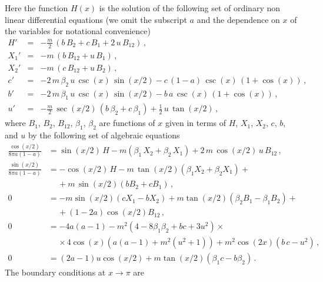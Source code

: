 \documentclass[11pt]{article}
\def\nn{\nonumber}
\begin{document}
Here the function $H(x)$ is the solution of the following set of ordinary non linear differential equations (we omit the subscript $a$ and the dependence on $x$ of the variables for notational convenience)
\begin{eqnarray} 
H' &=& - \frac{m}{2}\,\left( b\,B_2 +c\, B_1 + 2\,u\,B_{12} \right)\label{hprima}\,,\\
X_1' &=& - m\,\left( b\,B_{12}+ u\,B_1 \right)\label{x1prima} \,,\\
X_2' &=& - m\,\left( c\,B_{12} + u\,B_2 \right) \label{x2prima}\,,\\
c' &=&- 2\,m\,\beta_2 \,u\, \csc(x)\,\sin(x/2) - c\,(1 - a)\,\csc(x)\,(1 + \cos(x))\label{cprima}\,, \\
b' &=& -2\,m\,\beta_1\,u\,\csc(x)\,\sin(x/2) - b\,a\,\csc(x)\,(1 + \cos(x)) \label{bprima} \,,\\
u'&=&-\frac{m}{2}\,\sec(x/2)\,(b\,\beta_2+ c\,\beta_1) + \frac{1}{2}\,u\,\tan \left(x/2 \right)\label{uprima} \,,
\end{eqnarray}
where $B_1$, $B_2$, $B_{12}$, $\beta_1$, $\beta_2$ are functions of $x$ given in terms of $H$, $X_1$, $X_2$, $c$, $b$, and $u$ by the following set of algebraic equations
\begin{align}
\frac{\cos(x/2)}{8 
\pi a(1 - a)}&=\sin(x/2)\,H - m \left(\beta_1\, X_2 + \beta_2\, X_1\right) + 2\,m\,\cos(x/2)\, u\, B_{12}\,,\label{29} \\
\frac{\sin(x/2)}{8 \pi a(1 - a)}&=-\cos(x/2)\,H - m\, \tan(x/2)\left(\beta_1 X_2 + \beta_2 X_1 \right) + \nn\\
  & \quad \, + m\,\sin(x/2)(b B_2 + c B_1) \,,\label{30}\\
0&= -m \sin(x/2)(c X_1
 -b X_2) + m \tan(x/2)(\beta_2 B_1- \beta_1 B_2)+ \nn\\
 & \quad \, + (1-2a)\cos(x/2) B_{12}\,,\label{31}\\
0&=-4a(a - 1) - m^2(4 - 8\beta_1\beta_2 + b c + 3u^2) \times \nonumber\\
& \quad  \, \times  4\cos(x)\left(a(a - 1) + m^2(u^2 + 1)\right) 
      + m^2\cos(2x)(b\,c - u^2)\label{4a}\,,\\
0&=(2a - 1)u\cos(x/2)+m \tan(x/2)(\beta_1 c - b \beta_2)\,.\label{minuscula}
\end{align}
The boundary conditions at $x\rightarrow\pi$ are
\end{document}
